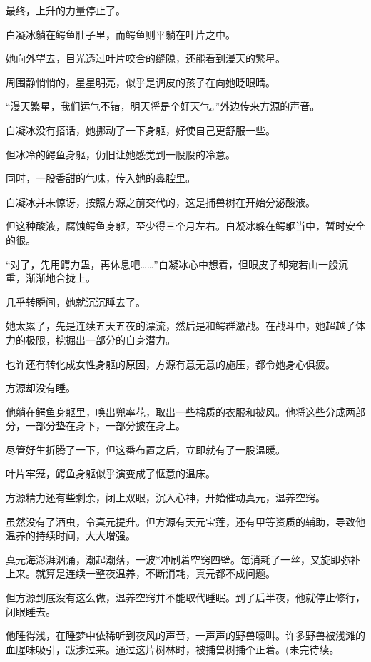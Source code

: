 \begin{this_body}
最终，上升的力量停止了。

白凝冰躺在鳄鱼肚子里，而鳄鱼则平躺在叶片之中。

她向外望去，目光透过叶片咬合的缝隙，还能看到漫天的繁星。

周围静悄悄的，星星明亮，似乎是调皮的孩子在向她眨眼睛。

“漫天繁星，我们运气不错，明天将是个好天气。”外边传来方源的声音。

白凝冰没有搭话，她挪动了一下身躯，好使自己更舒服一些。

但冰冷的鳄鱼身躯，仍旧让她感觉到一股股的冷意。

同时，一股香甜的气味，传入她的鼻腔里。

白凝冰并未惊讶，按照方源之前交代的，这是捕兽树在开始分泌酸液。

但这种酸液，腐蚀鳄鱼身躯，至少得三个月左右。白凝冰躲在鳄躯当中，暂时安全的很。

“对了，先用鳄力蛊，再休息吧……”白凝冰心中想着，但眼皮子却宛若山一般沉重，渐渐地合拢上。

几乎转瞬间，她就沉沉睡去了。

她太累了，先是连续五天五夜的漂流，然后是和鳄群激战。在战斗中，她超越了体力的极限，挖掘出一部分的自身潜力。

也许还有转化成女性身躯的原因，方源有意无意的施压，都令她身心俱疲。

方源却没有睡。

他躺在鳄鱼身躯里，唤出兜率花，取出一些棉质的衣服和披风。他将这些分成两部分，一部分垫在身下，一部分披在身上。

尽管好生折腾了一下，但这番布置之后，立即就有了一股温暖。

叶片牢笼，鳄鱼身躯似乎演变成了惬意的温床。

方源精力还有些剩余，闭上双眼，沉入心神，开始催动真元，温养空窍。

虽然没有了酒虫，令真元提升。但方源有天元宝莲，还有甲等资质的辅助，导致他温养的持续时间，大大增强。

真元海澎湃汹涌，潮起潮落，一波*冲刷着空窍四壁。每消耗了一丝，又旋即弥补上来。就算是连续一整夜温养，不断消耗，真元都不成问题。

但方源到底没有这么做，温养空窍并不能取代睡眠。到了后半夜，他就停止修行，闭眼睡去。

他睡得浅，在睡梦中依稀听到夜风的声音，一声声的野兽嚎叫。许多野兽被浅滩的血腥味吸引，跋涉过来。通过这片树林时，被捕兽树捕个正着。(未完待续。

\end{this_body}


